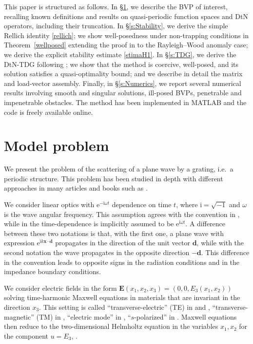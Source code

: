 \documentclass[a4paper,10pt]{article}
\newcommand{\bx}{{\mathbf x}}
\newcommand{\bd}{{\mathbf d}}
\newcommand{\ri}{{\mathrm i}}
\newcommand{\re}{{\mathrm e}}
\begin{document}
	This paper is structured as follows.
	In \S\ref{secmod}, we describe the BVP of interest, recalling known definitions and results on quasi-periodic function spaces and DtN operators, including their truncation.
	In \S\ref{s:Stability}, we derive the simple Rellich identity \eqref{rellich}; we show well-posedness under non-trapping conditions in Theorem~\ref{wellposed} extending the proof in \cite{BonnetBD1994} to the Rayleigh--Wood anomaly case; we derive the explicit stability estimate \eqref{stimaH1}.
	In \S\ref{s:TDG}, we derive the DtN-TDG following \cite{Hiptmair2011,Howarth2014,Kapita2018}; we show that the method is coercive, well-posed, and its solution satisfies a quasi-optimality bound; and we describe in detail the matrix and load-vector assembly.
	Finally, in \S\ref{s:Numerics}, we report several numerical results involving smooth and singular solutions, ill-posed BVPs, penetrable and impenetrable obstacles.
	The method has been implemented in MATLAB and the code is freely available online.
	
	\section{Model problem} \label{secmod}
	
	We present the problem of the scattering of a plane wave by a grating, i.e.\ a periodic structure.
	This problem has been studied in depth with different approaches in many articles and books such as \cite{BonnetBD1994,Civiletti2020,Kirsch1993}.
	
	We consider linear optics with $\re^{-\ri \omega t}$ dependence on time $t$, where $\ri = \sqrt{-1}$ and $\omega$ is the wave angular frequency. 
	This assumption agrees with the convention in \cite{Civiletti2020,Huttunen2002,Howarth2014}, 
	while in \cite{Hiptmair2016,Hiptmair2011,Kapita2018} the time-dependence is implicitly assumed to be $\re^{\ri \omega t}$.
	A difference between these two notations is that, with the first one, a plane wave with expression $\re^{\ri k \bx \cdot \bd}$ propagates in the direction of the unit vector $\bd$, while with the second notation the wave propagates in the opposite direction $-\bd$. This difference in the convention leads to opposite signs in the radiation conditions and in the impedance boundary conditions. 
	
	We consider electric fields in the form $\mathbf E(x_1,x_2,x_3)=(0,0,E_3(x_1,x_2))$ solving time-harmonic Maxwell equations in materials that are invariant in the direction $x_3$.
	This setting is called ``transverse-electric'' (TE) in \cite[\S1.3]{BaoLi2022} and \cite{Zhu2024}, ``transverse-magnetic'' (TM) in \cite{BonnetBD1994}, ``electric mode'' in \cite{Lechleiter2010}, ``$s$-polarized'' in \cite{Civiletti2020}.
	Maxwell equations then reduce to the two-dimensional Helmholtz equation in the variables $x_1,x_2$ for the component $u=E_3$, \cite[eq.~(2.5)]{BonnetBD1994}.
	
\end{document}
